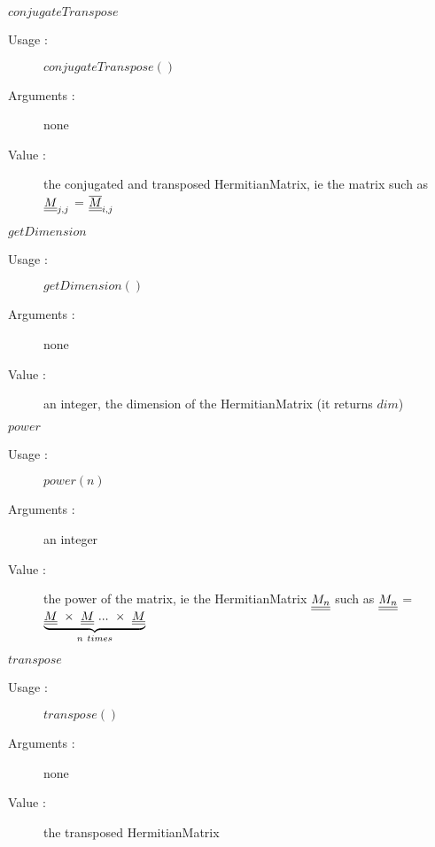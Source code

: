 \begin{description}
  \item $conjugateTranspose$
    \begin{description}
    \item[Usage :] $conjugateTranspose()$
    \item[Arguments :] none
    \item[Value :] the conjugated and transposed HermitianMatrix, ie the matrix such as ${\underline{\underline{M}}}_{j,j}$ = ${\underline{\underline{\overline{M}}}}_{i,j}$
    \end{description}
    \bigskip

  \item $getDimension$
    \begin{description}
    \item[Usage :] $getDimension()$
    \item[Arguments :] none
    \item[Value :] an integer, the dimension of the HermitianMatrix (it returns $dim$)
    \end{description}
    \bigskip

  \item $power$
    \begin{description}
    \item[Usage :] $power(n)$
    \item[Arguments :] an integer
    \item[Value :] the power of the matrix, ie the HermitianMatrix ${\underline{\underline{M_n}}}$ such as ${\underline{\underline{M_n}}}$  = $\underbrace{\mat{M} \ \times \ \mat{M} \ ...\ \times \ \mat{M}}_{n\ times}$ 
    \end{description}
    \bigskip

  \item $transpose$
    \begin{description}
    \item[Usage :] $transpose()$
    \item[Arguments :] none
    \item[Value :] the transposed HermitianMatrix
    \end{description}
    \bigskip

\end{description}




